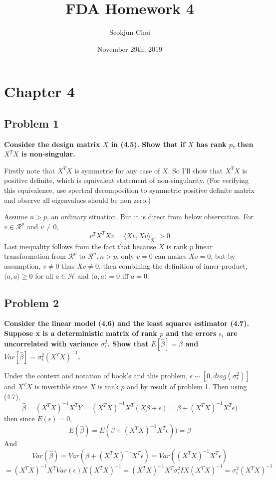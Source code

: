 \documentclass{article}
\begin{document}
\title{FDA Homework 4}
\author{Seokjun Choi}
\date{November 29th, 2019}
\maketitle

\section{Chapter 4}
\subsection{Problem 1}
\textbf{
Consider the design matrix $X$ in (4.5). 
Show that if $X$ has rank $p$, then $X^TX$ is non-singular.
}

Firstly note that $X^TX$ is symmetric for any case of $X$.
So I'll show that $X^TX$ is positive definite, which is equivalent statement of non-singularity.
(For verifying this equivalence, use spectral decomposition to symmetric positive definite matrix 
and observe all eigenvalues should be non zero.)

Assume $n>p$, an ordinary situation.
But it is direct from below observation. For $v\in\mathcal{R}^p$ and $v\neq 0$,
\[v^TX^TXv=\langle Xv, Xv\rangle_{\mathcal{R}^n} > 0\]
Last inequality follows from the fact that 
because $X$ is rank $p$ linear transformation from $\mathcal{R}^p$ to $\mathcal{R}^n, n>p$, 
only $v=0$ can makes $Xv=0$, but by assumption, $v\neq 0$ thus $Xv\neq 0$.
then combining the definition of inner-product, $\langle a,a \rangle \geq 0$ for all $a\in \mathcal{H} $ and $\langle a,a\rangle=0 \text{ iff } a=0$.


\subsection{Problem 2}
\textbf{
Consider the linear model (4.6) and the least squares estimator (4.7).
Suppose x is a deterministic matrix of rank $p$ and the errors $\epsilon_i$ are
uncorrelated with variance $\sigma_\epsilon^2$. Show that $E[\hat{\beta}]=\beta$ and 
$Var[\hat{\beta}]=\sigma_\epsilon^2(X^TX)^{-1}$.
}

Under the context and notation of book's and this problem,
\(\epsilon\sim[0, diag(\sigma^2_{\epsilon})]\) and
$X^TX$ is invertible since $X$ is rank $p$ and by result of problem 1.
Then using (4.7),
\[\hat{\beta}=(X^TX)^{-1}X^TY=(X^TX)^{-1}X^T(X\beta+\epsilon)=\beta+(X^TX)^{-1}X^T\epsilon)\]
then since $E(\epsilon)=0$,
\[E(\hat{\beta})=E(\beta+(X^TX)^{-1}X^T\epsilon))=\beta\]
And
\[Var(\hat{\beta})=Var(\beta+(X^TX)^{-1}X^T\epsilon)=Var((X^TX)^{-1}X^T\epsilon)\]
\[=(X^TX)^{-1}X^TVar(\epsilon)X(X^TX)^{-1}=(X^TX)^{-1}X^T\sigma^2_{\epsilon}IX(X^TX)^{-1}=\sigma^2_{\epsilon}(X^TX)^{-1}\]
\end{document}
